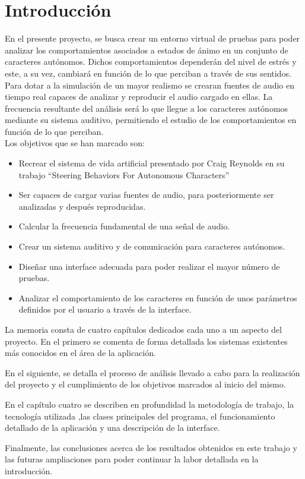 \section{Introducción}
\label{chap:introduccion}

En el presente proyecto, se busca crear un entorno virtual de pruebas para poder analizar los comportamientos asociados a estados de ánimo en un conjunto de caracteres autónomos. Dichos comportamientos dependerán del nivel de estrés y este, a su vez, cambiará en función de lo que perciban a través de sus sentidos.
Para dotar a la simulación de un mayor realismo se crearan fuentes de audio en tiempo real capaces de analizar y reproducir el audio cargado en ellas.  La frecuencia resultante del análisis será lo que llegue a los caracteres autónomos mediante su sistema auditivo, permitiendo el estudio de los comportamientos en función de lo que perciban.\\  

Los objetivos que se han marcado son:
\begin{itemize}
 \item Recrear el sistema de vida artificial presentado por Craig Reynolds en su trabajo “Steering Behaviors For Autonomous Characters”
 \item Ser capaces de cargar varias fuentes de audio, para posteriormente ser analizadas y después reproducidas. 
 \item Calcular la frecuencia fundamental de una señal de audio.
 \item Crear un sistema auditivo y de comunicación para caracteres autónomos. 
 \item Diseñar una interface adecuada para poder realizar el mayor número de pruebas.  
 \item Analizar el comportamiento de los caracteres en función de unos parámetros definidos por el usuario a través de la interface.
\end{itemize}

La memoria consta de cuatro capítulos dedicados cada uno a un aspecto del proyecto. En el primero se comenta de forma detallada los sistemas existentes más conocidos en el área de la aplicación. 

En el siguiente, se detalla el proceso de análisis llevado a cabo para la realización del proyecto y el cumplimiento de los objetivos marcados al inicio del mismo. 

En el capítulo cuatro se describen en profundidad la metodología de trabajo, la tecnología utilizada ,las clases principales del programa, el funcionamiento detallado de la aplicación y una descripción de la interface.
                   
Finalmente, las conclusiones acerca de los resultados obtenidos en este trabajo y las futuras ampliaciones para poder continuar la labor detallada en la introducción.

              
